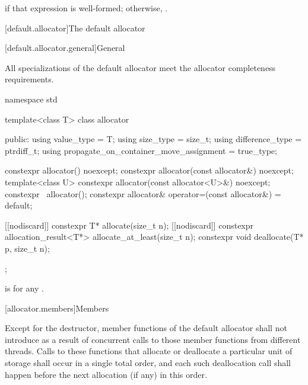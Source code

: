 \begin{itemdescr}
\pnum
\returns
{} if that expression is well-formed;
otherwise, .
\end{itemdescr}

[default.allocator]{The default allocator}

[default.allocator.general]{General}

\pnum
All specializations of the default allocator meet the
allocator completeness requirements.

%
%
%
%
%
%
%
\begin{codeblock}
namespace std {
  template<class T> class allocator {
   public:
    using value_type                             = T;
    using size_type                              = size_t;
    using difference_type                        = ptrdiff_t;
    using propagate_on_container_move_assignment = true_type;

    constexpr allocator() noexcept;
    constexpr allocator(const allocator&) noexcept;
    template<class U> constexpr allocator(const allocator<U>&) noexcept;
    constexpr ~allocator();
    constexpr allocator& operator=(const allocator&) = default;

    [[nodiscard]] constexpr T* allocate(size_t n);
    [[nodiscard]] constexpr allocation_result<T*> allocate_at_least(size_t n);
    constexpr void deallocate(T* p, size_t n);
  };
}
\end{codeblock}

\pnum
{}
is  for any .

[allocator.members]{Members}

\pnum
Except for the destructor, member functions of the default allocator shall not introduce
 as a result of concurrent calls to those member
functions from different threads. Calls to these functions that allocate or deallocate a
particular unit of storage shall occur in a single total order, and each such
deallocation call shall happen before the next allocation (if any) in this order.

